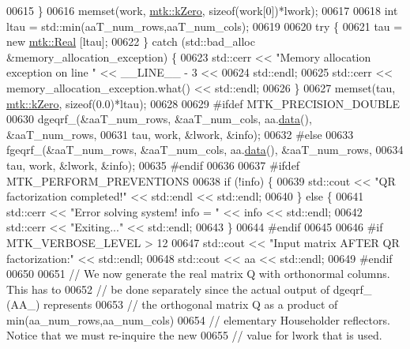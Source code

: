 \begin{DoxyCode}
00615   \}
00616   memset(work, \hyperlink{group__c01-roots_ga59a451a5fae30d59649bcda274fea271}{mtk::kZero}, \textcolor{keyword}{sizeof}(work[0])*lwork);
00617 
00618   \textcolor{keywordtype}{int} ltau = std::min(aaT\_num\_rows,aaT\_num\_cols);
00619 
00620   \textcolor{keywordflow}{try} \{
00621     tau = \textcolor{keyword}{new} \hyperlink{group__c01-roots_gac080bbbf5cbb5502c9f00405f894857d}{mtk::Real} [ltau];
00622   \} \textcolor{keywordflow}{catch} (std::bad\_alloc &memory\_allocation\_exception) \{
00623     std::cerr << \textcolor{stringliteral}{"Memory allocation exception on line "} << \_\_LINE\_\_ - 3 <<
00624       std::endl;
00625     std::cerr << memory\_allocation\_exception.what() << std::endl;
00626   \}
00627   memset(tau, \hyperlink{group__c01-roots_ga59a451a5fae30d59649bcda274fea271}{mtk::kZero}, \textcolor{keyword}{sizeof}(0.0)*ltau);
00628 
00629 \textcolor{preprocessor}{  #ifdef MTK\_PRECISION\_DOUBLE}
00630   dgeqrf\_(&aaT\_num\_rows, &aaT\_num\_cols, aa.\hyperlink{classmtk_1_1DenseMatrix_a0c33b8a9e01d157c61ddbdf807c25d84}{data}(), &aaT\_num\_rows,
00631           tau, work, &lwork, &info);
00632 \textcolor{preprocessor}{  #else}
00633   fgeqrf\_(&aaT\_num\_rows, &aaT\_num\_cols, aa.\hyperlink{classmtk_1_1DenseMatrix_a0c33b8a9e01d157c61ddbdf807c25d84}{data}(), &aaT\_num\_rows,
00634           tau, work, &lwork, &info);
00635 \textcolor{preprocessor}{  #endif}
00636 
00637 \textcolor{preprocessor}{  #ifdef MTK\_PERFORM\_PREVENTIONS}
00638   \textcolor{keywordflow}{if} (!info) \{
00639     std::cout << \textcolor{stringliteral}{"QR factorization completed!"} << std::endl << std::endl;
00640   \} \textcolor{keywordflow}{else} \{
00641     std::cerr << \textcolor{stringliteral}{"Error solving system! info = "} << info << std::endl;
00642     std::cerr << \textcolor{stringliteral}{"Exiting..."} << std::endl;
00643   \}
00644 \textcolor{preprocessor}{  #endif}
00645 
00646 \textcolor{preprocessor}{  #if MTK\_VERBOSE\_LEVEL > 12}
00647   std::cout << \textcolor{stringliteral}{"Input matrix AFTER QR factorization:"} << std::endl;
00648   std::cout << aa << std::endl;
00649 \textcolor{preprocessor}{  #endif}
00650 
00651   \textcolor{comment}{// We now generate the real matrix Q with orthonormal columns. This has to}
00652   \textcolor{comment}{// be done separately since the actual output of dgeqrf\_ (AA\_) represents}
00653   \textcolor{comment}{// the orthogonal matrix Q as a product of min(aa\_num\_rows,aa\_num\_cols)}
00654   \textcolor{comment}{// elementary Householder reflectors. Notice that we must re-inquire the new}
00655   \textcolor{comment}{// value for lwork that is used.}

\end{DoxyCode}
